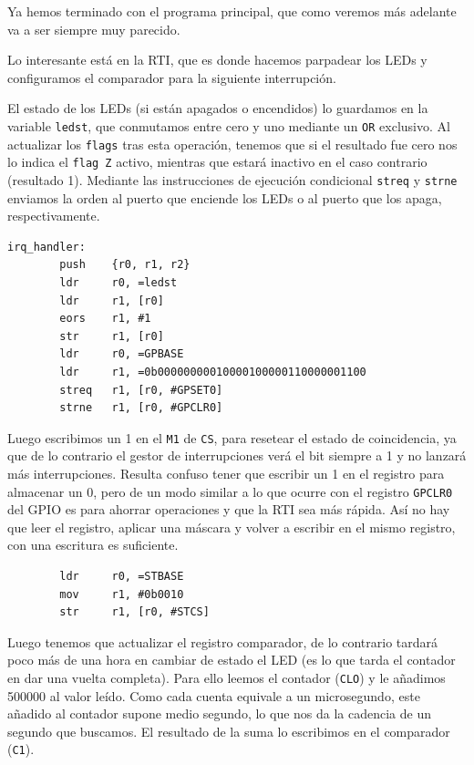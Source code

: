 Ya hemos terminado con el programa principal, que como veremos más adelante va a ser
siempre muy parecido.

Lo interesante está en la RTI, que es donde hacemos parpadear los LEDs y configuramos
el comparador para la siguiente interrupción.

El estado de los LEDs (si están apagados o encendidos) lo guardamos en la variable
{\tt ledst}, que conmutamos entre cero y uno mediante un {\tt OR} exclusivo. Al
actualizar los {\tt flags} tras esta operación, tenemos que si el resultado fue
cero nos lo indica el {\tt flag Z} activo, mientras que estará inactivo en el
caso contrario (resultado 1). Mediante las instrucciones de ejecución condicional
{\tt streq} y {\tt strne} enviamos la orden al puerto que enciende los LEDs o al
puerto que los apaga, respectivamente.

\begin{lstlisting}
irq_handler:
        push    {r0, r1, r2}
        ldr     r0, =ledst
        ldr     r1, [r0]
        eors    r1, #1
        str     r1, [r0]
        ldr     r0, =GPBASE
        ldr     r1, =0b00000000010000100000110000001100
        streq   r1, [r0, #GPSET0]
        strne   r1, [r0, #GPCLR0]
\end{lstlisting}


Luego escribimos un 1 en el {\tt M1} de {\tt CS}, para resetear el estado de coincidencia, ya
que de lo contrario el gestor de interrupciones verá el bit siempre a 1 y no lanzará más
interrupciones. Resulta confuso tener que escribir un 1 en el registro para almacenar un 0, pero
de un modo similar a lo que ocurre con el registro {\tt GPCLR0} del GPIO es para ahorrar
operaciones y que la RTI sea más rápida. Así no hay que leer el registro, aplicar una máscara y
volver a escribir en el mismo registro, con una escritura es suficiente.

\begin{lstlisting}
        ldr     r0, =STBASE
        mov     r1, #0b0010
        str     r1, [r0, #STCS]
\end{lstlisting}

Luego tenemos que actualizar el registro comparador, de lo contrario tardará poco más
de una hora en cambiar de estado el LED (es lo que tarda el contador en dar una vuelta
completa). Para ello leemos el contador ({\tt CLO}) y le añadimos 500000 al valor leído. Como cada
cuenta equivale a un microsegundo, este añadido al contador supone medio segundo, lo
que nos da la cadencia de un segundo que buscamos. El resultado de la suma lo escribimos
en el comparador ({\tt C1}).

